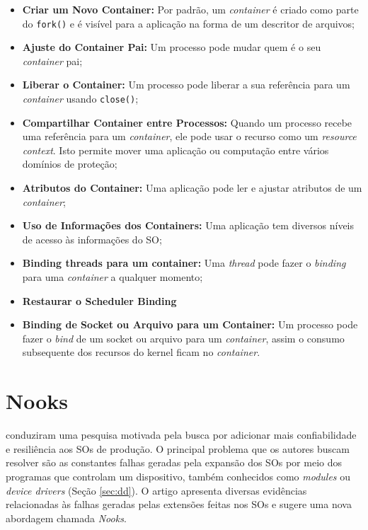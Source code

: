 \begin{itemize}
	\item \textbf{Criar um Novo Container:} Por padrão, um \emph{container} é criado
				como parte do \texttt{fork()} e é visível para a aplicação na forma
				de um descritor de arquivos;
	\item \textbf{Ajuste do Container Pai:} Um processo pode mudar quem é o seu
				\emph{container} pai;
	\item \textbf{Liberar o Container:} Um processo pode liberar a sua referência
				para um \emph{container} usando \texttt{close()};
	\item \textbf{Compartilhar Container entre Processos:} Quando um processo
				recebe uma referência para um \emph{container}, ele pode usar o recurso como
				um \emph{resource context}. Isto permite mover uma aplicação ou
				computação entre vários domínios de proteção;
	\item \textbf{Atributos do Container:} Uma aplicação pode ler e ajustar
				atributos de um \emph{container};
	\item \textbf{Uso de Informações dos Containers:} Uma aplicação tem diversos
        níveis de acesso às informações do SO;
	\item \textbf{Binding threads para um container:} Uma \emph{thread} pode fazer o
		\emph{binding} para uma \emph{container} a qualquer momento;
	\item \textbf{Restaurar o Scheduler Binding}
	\item \textbf{Binding de Socket ou Arquivo para um Container:} Um processo
				pode fazer o \emph{bind} de um socket ou arquivo para um \emph{container},
				assim o consumo subsequente dos recursos do kernel ficam no \emph{container}.
\end{itemize}

\section{Nooks}
\citet{nooks} conduziram uma pesquisa motivada pela busca por
adicionar mais confiabilidade e resiliência aos SOs de produção. O principal
problema que os autores buscam resolver são as constantes falhas geradas pela
expansão dos SOs por meio dos programas que controlam um dispositivo, também
conhecidos como \emph{modules} ou \emph{device drivers} (Seção \ref{sec:dd}). O
artigo apresenta diversas evidências relacionadas às falhas geradas
pelas extensões feitas nos SOs e sugere uma nova abordagem chamada
\emph{Nooks}.

